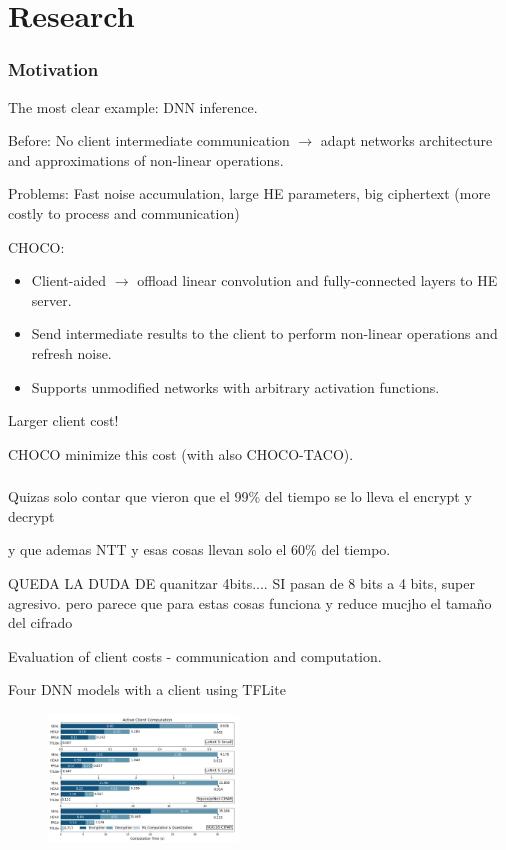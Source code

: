 \documentclass[10pt,handout]{beamer}
\begin{document}

\section{Research}

\begin{frame}
\frametitle{Motivation}
The most clear example: DNN inference. %

Before: No client intermediate communication $\rightarrow$ adapt networks architecture and approximations of non-linear operations.

    Problems: Fast noise accumulation, large HE parameters, big ciphertext (more costly to process and communication)

CHOCO:
\begin{itemize}
    \item Client-aided $\rightarrow$ offload linear convolution and fully-connected layers to HE server.
    \item Send intermediate results to the client to perform non-linear operations and refresh noise.
    \item Supports unmodified networks with arbitrary activation functions.
\end{itemize}

Larger client cost!

    CHOCO minimize this cost (with also CHOCO-TACO).

\end{frame}




\begin{frame}
\frametitle{}

Quizas solo contar que vieron que el 99\% del tiempo se lo lleva el encrypt y decrypt

y que ademas NTT y esas cosas llevan solo el 60\% del tiempo.

QUEDA LA DUDA DE quanitzar 4bits.... SI pasan de 8 bits a 4 bits, super agresivo.
pero parece que para estas cosas funciona y reduce mucjho el tamaño del cifrado

Evaluation of client costs - communication and computation.

Four DNN models with a client using TFLite
\begin{figure}
    \includegraphics[width=0.45\textwidth]{motivation.png}
\end{figure}

\end{frame}
\end{document}
